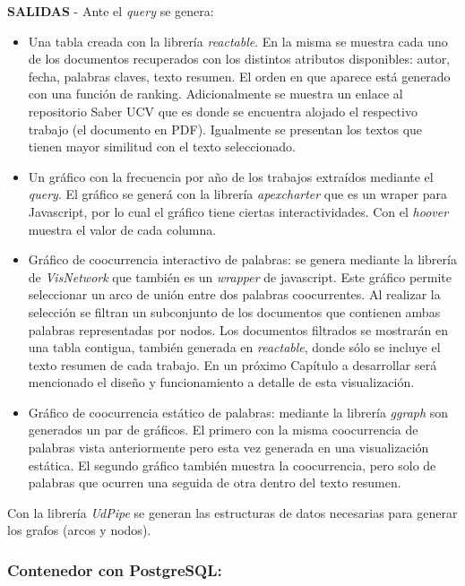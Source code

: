 \documentclass[
  10,
  openany]{book}
\begin{document}
\textbf{SALIDAS} - Ante el \emph{query} se genera:

\begin{itemize}
\item
  Una tabla creada con la librería \emph{reactable}. En la misma se muestra cada uno de los documentos recuperados con los distintos atributos disponibles: autor, fecha, palabras claves, texto resumen. El orden en que aparece está generado con una función de ranking. Adicionalmente se muestra un enlace al repositorio Saber UCV que es donde se encuentra alojado el respectivo trabajo (el documento en PDF). Igualmente se presentan los textos que tienen mayor similitud con el texto seleccionado.
\item
  Un gráfico con la frecuencia por año de los trabajos extraídos mediante el \emph{query}. El gráfico se generá con la librería \emph{apexcharter} que es un wraper para Javascript, por lo cual el gráfico tiene ciertas interactividades. Con el \emph{hoover} muestra el valor de cada columna.
\item
  Gráfico de coocurrencia interactivo de palabras: se genera mediante la librería de \emph{VisNetwork} que también es un \emph{wrapper} de javascript. Este gráfico permite seleccionar un arco de unión entre dos palabras coocurrentes. Al realizar la selección se filtran un subconjunto de los documentos que contienen ambas palabras representadas por nodos. Los documentos filtrados se mostrarán en una tabla contigua, también generada en \emph{reactable}, donde sólo se incluye el texto resumen de cada trabajo. En un próximo Capítulo a desarrollar será mencionado el diseño y funcionamiento a detalle de esta visualización.
\item
  Gráfico de coocurrencia estático de palabras: mediante la librería \emph{ggraph} son generados un par de gráficos. El primero con la misma coocurrencia de palabras vista anteriormente pero esta vez generada en una visualización estática. El segundo gráfico también muestra la coocurrencia, pero solo de palabras que ocurren una seguida de otra dentro del texto resumen.
\end{itemize}

Con la librería \emph{UdPipe} se generan las estructuras de datos necesarias para generar los grafos (arcos y nodos).

\hypertarget{conposgres}{%
\subsubsection{Contenedor con PostgreSQL:}\label{conposgres}}
\end{document}
